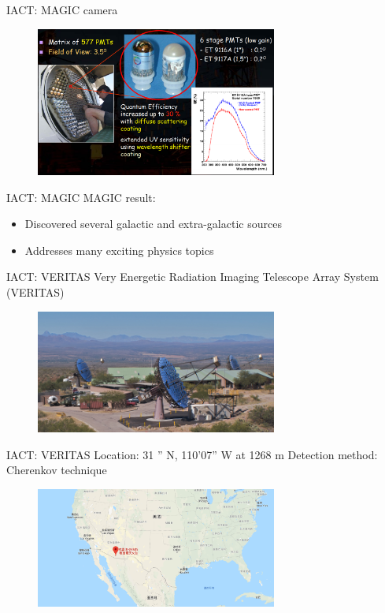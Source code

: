 \documentclass{beamer}
\begin{document}
\begin{frame}{IACT: MAGIC camera}
    \begin{figure}[h]
        \includegraphics[width=300px]{MAGIC_PMTs.png}
    \end{figure}
\end{frame}


\begin{frame}{IACT: MAGIC}
    MAGIC result:
    \begin{itemize}
        \item Discovered several galactic and extra-galactic sources
        \item Addresses many exciting physics topics
    \end{itemize}
\end{frame}


\begin{frame}{IACT: VERITAS}
    Very Energetic Radiation Imaging Telescope Array System (VERITAS)
    \begin{figure}[h]
        \includegraphics[width=300px]{VERITAS.jpg}
    \end{figure}
\end{frame}


\begin{frame}{IACT: VERITAS}
    Location: 31 '' N, 110'07'' W at 1268 m
    \newline
    Detection method:  Cherenkov technique
    \begin{figure}[h]
        \includegraphics[width=300px]{VERITAS_location.png}
    \end{figure}
\end{frame}
\end{document}
